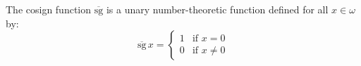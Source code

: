 The cosign function $\overline{\text{sg}}$ is a unary number-theoretic function defined for all $x \in \omega$ by:
$$\overline{\text{sg}}\, x = \begin{cases} 1 & \text{if } x = 0 \\ 0 & \text{if } x \neq 0 \end{cases}$$
